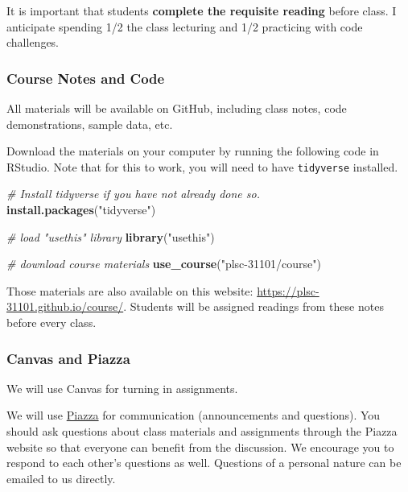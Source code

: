\documentclass[]{book}
\newenvironment{Shaded}{\begin{snugshade}}{\end{snugshade}}
\newcommand{\KeywordTok}[1]{\textcolor[rgb]{0.13,0.29,0.53}{\textbf{#1}}}
\newcommand{\StringTok}[1]{\textcolor[rgb]{0.31,0.60,0.02}{#1}}
\newcommand{\CommentTok}[1]{\textcolor[rgb]{0.56,0.35,0.01}{\textit{#1}}}
\newcommand{\NormalTok}[1]{#1}
\begin{document}
It is important that students \textbf{complete the requisite reading}
before class. I anticipate spending 1/2 the class lecturing and 1/2
practicing with code challenges.

\subsubsection*{Course Notes and Code}\label{course-notes-and-code}

All materials will be available on GitHub, including class notes, code
demonstrations, sample data, etc.

Download the materials on your computer by running the following code in
RStudio. Note that for this to work, you will need to have
\texttt{tidyverse} installed.

\begin{Shaded}
\begin{Highlighting}[]
\CommentTok{# Install tidyverse if you have not already done so.}
\KeywordTok{install.packages}\NormalTok{(}\StringTok{"tidyverse"}\NormalTok{)}

\CommentTok{# load "usethis" library}
\KeywordTok{library}\NormalTok{(}\StringTok{"usethis"}\NormalTok{)}

\CommentTok{# download course materials}
\KeywordTok{use_course}\NormalTok{(}\StringTok{"plsc-31101/course"}\NormalTok{)}
\end{Highlighting}
\end{Shaded}

Those materials are also available on this website:
\url{https://plsc-31101.github.io/course/}. Students will be assigned
readings from these notes before every class.

\subsubsection*{Canvas and Piazza}\label{canvas-and-piazza}

We will use Canvas for turning in assignments.

We will use \href{piazza.com/uchicago/fall2020/plsc31101/home}{Piazza}
for communication (announcements and questions). You should ask
questions about class materials and assignments through the Piazza
website so that everyone can benefit from the discussion. We encourage
you to respond to each other's questions as well. Questions of a
personal nature can be emailed to us directly.
\end{document}
